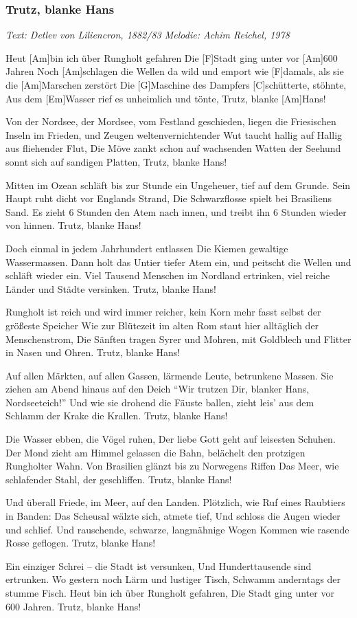 \documentclass[a5paper,pagesize,twoside,10pt,headings=small]{scrartcl}
\newcommand\songheader[3][]{%
    \subsubsection*{\centering #2}\vspace{0.5\baselineskip}%
    \addcontentsline{toc}{subsection}{#2}
    \centering \textit{#3}\\%
    \vspace{\baselineskip}\par%
}
\newenvironment{myguitar}{\begin{guitar}}{\clearpage\end{guitar}}
\begin{document}
\songheader{Trutz, blanke Hans}{Text: Detlev von Liliencron, 1882/83 \quad Melodie: Achim Reichel, 1978}
\begin{myguitar}
Heut [Am]bin ich über Rungholt gefahren
Die [F]Stadt ging unter vor [Am]600 Jahren
Noch [Am]schlagen die Wellen da wild und emport
wie [F]damals, als sie die [Am]Marschen zerstört
Die [G]Maschine des Dampfers [C]schütterte, stöhnte, 
Aus dem [Em]Wasser rief es unheimlich und tönte,
Trutz, blanke [Am]Hans!

Von der Nordsee, der Mordsee, vom Festland geschieden,
liegen die Friesischen Inseln im Frieden,
und Zeugen weltenvernichtender Wut
taucht hallig auf Hallig aus fliehender Flut,
Die Möve zankt schon auf wachsenden Watten
der Seehund sonnt sich auf sandigen Platten,
Trutz, blanke Hans!

Mitten im Ozean schläft bis zur Stunde
ein Ungeheuer, tief auf dem Grunde.
Sein Haupt ruht dicht vor Englands Strand,
Die Schwarzflosse spielt bei Brasiliens Sand.
Es zieht 6 Stunden den Atem nach innen,
und treibt ihn 6 Stunden wieder von hinnen.
Trutz, blanke Hans!

Doch einmal in jedem Jahrhundert entlassen
Die Kiemen gewaltige Wassermassen.
Dann holt das Untier tiefer Atem ein,
und peitscht die Wellen und schläft wieder ein.
Viel Tausend Menschen im Nordland ertrinken,
viel reiche Länder und Städte versinken.
Trutz, blanke Hans!

Rungholt ist reich und wird immer reicher,
kein Korn mehr fasst selbst der größeste Speicher
Wie zur Blütezeit im alten Rom
staut hier alltäglich der Menschenstrom,
Die Sänften tragen Syrer und Mohren,
mit Goldblech und Flitter in Nasen und Ohren.
Trutz, blanke Hans!

Auf allen Märkten, auf allen Gassen,
lärmende Leute, betrunkene Massen.
Sie ziehen am Abend hinaus auf den Deich
"`Wir trutzen Dir, blanker Hans, Nordseeteich!"'
Und wie sie drohend die Fäuste ballen,
zieht leis' aus dem Schlamm der Krake die Krallen.
Trutz, blanke Hans!

Die Wasser ebben, die Vögel ruhen,
Der liebe Gott geht auf leisesten Schuhen.
Der Mond zieht am Himmel gelassen die Bahn,
belächelt den protzigen Rungholter Wahn.
Von Brasilien glänzt bis zu Norwegens Riffen
Das Meer, wie schlafender Stahl, der geschliffen.
Trutz, blanke Hans!

Und überall Friede, im Meer, auf den Landen.
Plötzlich, wie Ruf eines Raubtiers in Banden:
Das Scheusal wälzte sich, atmete tief,
Und schloss die Augen wieder und schlief.
Und rauschende, schwarze, langmähnige Wogen
Kommen wie rasende Rosse geflogen.
Trutz, blanke Hans!

Ein einziger Schrei -- die Stadt ist versunken,
Und Hunderttausende sind ertrunken.
Wo gestern noch Lärm und lustiger Tisch,
Schwamm anderntags der stumme Fisch.
Heut bin ich über Rungholt gefahren,
Die Stadt ging unter vor 600 Jahren.
Trutz, blanke Hans!
\end{myguitar}
\end{document}
